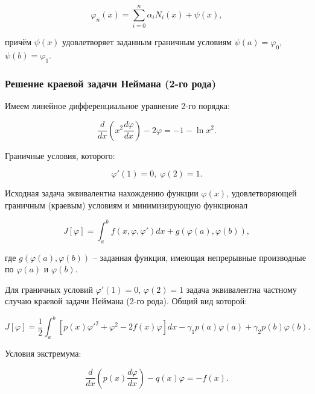 \documentclass{article}
\begin{document}
\begin{equation}\label{equation_solve_var_rank_2}
	\varphi_{n}(x) = \sum_{i=0}^n \alpha_{i}N_{i}(x) + \psi(x),
\end{equation}

\noindent причём $\psi(x)$ удовлетворяет заданным граничным условиям $\psi(a) = \varphi_{0}$, $\psi(b) = \varphi_{1}$.

\subsubsection{Решение краевой задачи Неймана (2-го рода)}

Имеем линейное дифференциальное уравнение 2-го порядка:

\begin{equation}\label{equation_rang_2}
	\frac{d}{dx}(x^2 \frac{d \varphi}{dx}) - 2\varphi = -1 - \ln{x^2}.
\end{equation}

\noindent Граничные условия, которого:

\begin{equation}
	\varphi'(1) = 0, \; \varphi(2) = 1.
\end{equation}

Исходная задача эквивалентна нахождению функции $\varphi(x)$, удовлетворяющей граничным (краевым) условиям и минимизирующую функционал

\begin{equation}
	J[\varphi] = \int_{a}^{b} f(x, \varphi, \varphi')dx + g(\varphi(a), \varphi(b)),
\end{equation}

\noindent где $g(\varphi(a), \varphi(b))$ – заданная функция, имеющая непрерывные производные по $\varphi(a)$ и $\varphi(b)$.

Для граничных условий $\varphi'(1) = 0$, $\varphi(2) = 1$ задача эквивалентна частному случаю краевой задачи Неймана (2-го рода). Общий вид которой:

\begin{equation}
	J[\varphi] = \frac{1}{2} \int_{a}^{b} [p(x) \varphi'^2 + \varphi^2 - 2f(x)\varphi]dx - \gamma_{1} p(a) \varphi(a) + \gamma_{2} p(b) \varphi(b).
\end{equation}

\noindent Условия экстремума:

\begin{equation}
	\frac{d}{dx} (p(x) \frac{d\varphi}{dx}) - q(x)\varphi = -f(x).
\end{equation}
\end{document}
